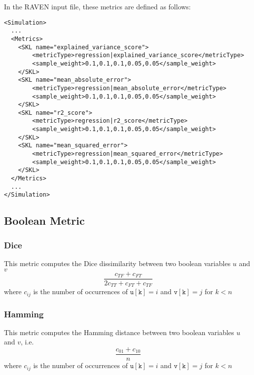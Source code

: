 
In the RAVEN input file, these metrics are defined as follows:
\begin{lstlisting}[style=XML]
<Simulation>
  ...
  <Metrics>
    <SKL name="explained_variance_score">
        <metricType>regression|explained_variance_score</metricType>
        <sample_weight>0.1,0.1,0.1,0.05,0.05</sample_weight>
    </SKL>
    <SKL name="mean_absolute_error">
        <metricType>regression|mean_absolute_error</metricType>
        <sample_weight>0.1,0.1,0.1,0.05,0.05</sample_weight>
    </SKL>
    <SKL name="r2_score">
        <metricType>regression|r2_score</metricType>
        <sample_weight>0.1,0.1,0.1,0.05,0.05</sample_weight>
    </SKL>
    <SKL name="mean_squared_error">
        <metricType>regression|mean_squared_error</metricType>
        <sample_weight>0.1,0.1,0.1,0.05,0.05</sample_weight>
    </SKL>
  </Metrics>
  ...
</Simulation>
\end{lstlisting}

\subsection{Boolean Metric}
\label{subsection:boolean}

\subsubsection{Dice}
This metric computes the Dice dissimilarity between two boolean variables $u$ and $v$
\begin{equation}
  \frac{c_{TF} + c_{FT}}{2c_{TT} + c_{FT} + c_{TF}}
\end{equation}
where $c_{ij}$ is the number of occurrences of $\mathtt{u[k]} = i$ and $\mathtt{v[k]} = j$ for $k < n$


\subsubsection{Hamming}
This metric computes the Hamming distance between two boolean variables $u$ and $v$, i.e.
\begin{equation}
  \frac{c_{01} + c_{10}}{n}
\end{equation}
where $c_{ij}$ is the number of occurrences of $\mathtt{u[k]} = i$ and $\mathtt{v[k]} = j$ for $k < n$


